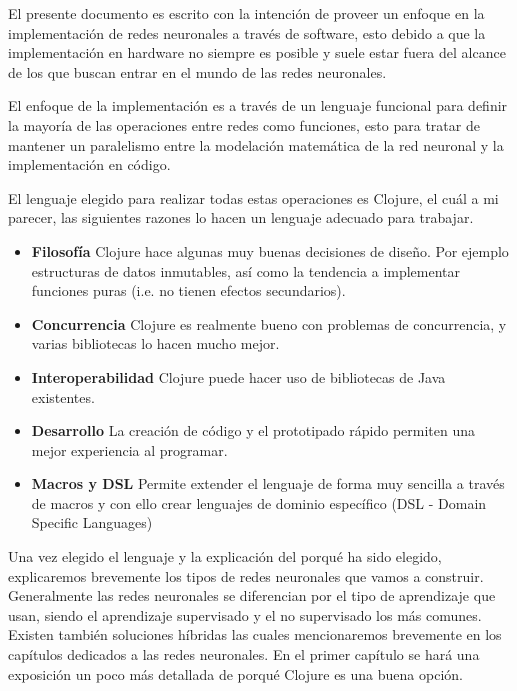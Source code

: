 \begin{prefacio}

  El presente documento es escrito con la intención de proveer un
  enfoque en la implementación de redes neuronales a través de
  software, esto debido a que la implementación en hardware no siempre
  es posible y suele estar fuera del alcance de los que buscan entrar
  en el mundo de las redes neuronales.

  El enfoque de la implementación es a través de un lenguaje funcional
  para definir la mayoría de las operaciones entre redes como
  funciones, esto para tratar de mantener un paralelismo entre la
  modelación matemática de la red neuronal y la implementación en
  código.

  El lenguaje elegido para realizar todas estas operaciones es
  Clojure, el cuál a mi parecer, las siguientes razones lo hacen un
  lenguaje adecuado para trabajar.

  \begin{itemize}
  \item \textbf{Filosofía} Clojure hace algunas muy buenas decisiones de
    diseño. Por ejemplo estructuras de datos inmutables, así como la
    tendencia a implementar funciones puras (i.e. no tienen efectos
    secundarios).
  \item \textbf{Concurrencia} Clojure es realmente bueno con problemas de
    concurrencia, y varias bibliotecas lo hacen mucho mejor.
  \item \textbf{Interoperabilidad} Clojure puede hacer uso de bibliotecas de
    Java existentes.
  \item \textbf{Desarrollo} La creación de código y el prototipado rápido
    permiten una mejor experiencia al programar.
  \item \textbf{Macros y DSL} Permite extender el lenguaje de forma muy
    sencilla a través de macros y con ello crear lenguajes de dominio
    específico (DSL - Domain Specific Languages)
  \end{itemize}

  Una vez elegido el lenguaje y la explicación del porqué ha sido
  elegido, explicaremos brevemente los tipos de redes neuronales que
  vamos a construir. Generalmente las redes neuronales se diferencian
  por el tipo de aprendizaje que usan, siendo el aprendizaje
  supervisado y el no supervisado los más comunes. Existen también
  soluciones híbridas las cuales mencionaremos brevemente en los
  capítulos dedicados a las redes neuronales. En el primer capítulo se
  hará una exposición un poco más detallada de porqué Clojure es una
  buena opción.


\end{prefacio}
